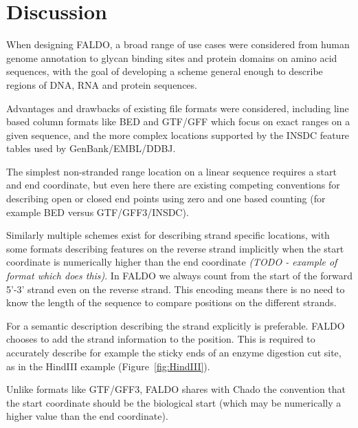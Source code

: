 \section*{Discussion}
When designing FALDO, a broad range of use cases were considered from
human genome annotation to glycan binding sites and protein domains on
amino acid sequences, with the goal of developing a scheme general enough
to describe regions of DNA, RNA and protein sequences.

Advantages and drawbacks of existing file formats were considered, including
line based column formats like BED and GTF/GFF which focus on exact
ranges on a given sequence, and the more complex locations supported
by the INSDC feature tables used by GenBank/EMBL/DDBJ.

The simplest non-stranded range location on a linear sequence requires
a start and end coordinate, but even here there are existing competing
conventions for describing open or closed end points using zero and
one based counting (for example BED versus GTF/GFF3/INSDC).

Similarly multiple schemes exist for describing strand specific locations,
with some formats describing features on the reverse strand implicitly
when the start coordinate is numerically higher than the end coordinate
\textit{(TODO - example of format which does this)}.
In FALDO we always count from the start of the forward 5'-3' strand even on the reverse strand.
This encoding means there is no need to know the length of the sequence to compare positions on the different strands.

For a semantic description describing the strand explicitly is preferable.
FALDO chooses to add the strand information to the position. 
This is required to accurately describe for example the sticky ends
of an enzyme digestion cut site, as in the HindIII example (Figure~\ref{fig:HindIII}).

Unlike formats like GTF/GFF3, FALDO shares with Chado the convention
that the start coordinate should be the biological start (which 
may be numerically a higher value than the end coordinate).

